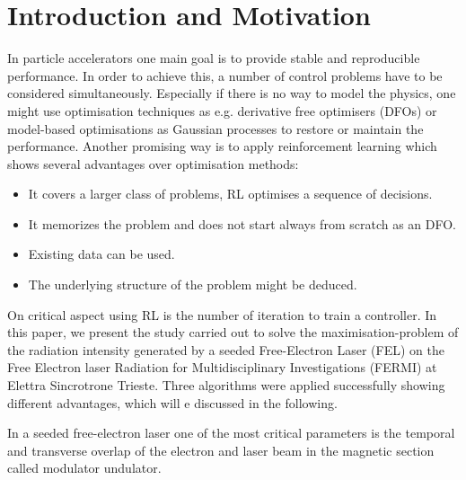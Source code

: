 \documentclass[
 reprint,
 amsmath,amssymb,amsfonts,clevref,
 aps,
prstab,
]{revtex4-2}
\begin{document}
\section{Introduction and Motivation}
In particle accelerators one main goal is to provide stable and reproducible performance. In order to achieve this, a number of control problems have to be considered simultaneously. Especially if there is no way to model the physics, one might use optimisation techniques as e.g. derivative free optimisers (DFOs) or model-based optimisations as Gaussian processes to restore or maintain the performance. Another promising way is to apply reinforcement learning which shows several advantages over optimisation methods:
\begin{itemize}
    \item It covers a larger class of problems, RL optimises a sequence of decisions.
    \item It memorizes the problem and does not start always from scratch as an DFO.
    \item Existing data can be used.
    \item The underlying structure of the problem might be deduced.
\end{itemize}
On critical aspect using RL is the number of iteration to train a controller.
In this paper, we present the study carried out to solve the maximisation-problem of the radiation intensity generated by a seeded Free-Electron Laser (FEL) on the Free Electron laser Radiation for Multidisciplinary Investigations (FERMI) at Elettra Sincrotrone Trieste. Three algorithms were applied successfully showing different advantages, which will e discussed in the following.


In a seeded free-electron laser one of the most critical parameters is the temporal and transverse overlap of the electron and laser beam in the magnetic section called modulator undulator. 
\end{document}
